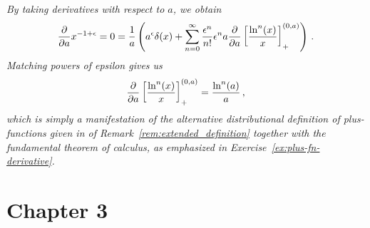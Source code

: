\begin{remarkbox*}{}{}
\textit{
    By taking derivatives with respect to \(a\), we obtain
    \begin{align}
        \frac{\partial}{\partial a}
        x^{-1 + \epsilon}
        =
        0
        =
        \frac{1}{a}
        \left(
            a^\epsilon \delta(x)
            +
            \sum_{n=0}^\infty
            \frac{\epsilon^n}{n!}
            \epsilon^n
            a
            \frac{\partial}{\partial a}
            \left[\frac{\ln^n(x)}{x}\right]_+^{(0,a)}
        \right)
        \,.
    \end{align}
    Matching powers of epsilon gives us
    \begin{align}
        \frac{\partial}{\partial a}
        \left[\frac{\ln^n(x)}{x}\right]_+^{(0,a)}
        =
        \frac{\ln^n(a)}{a}
        \,,
    \end{align}
    which is simply a manifestation of the alternative distributional definition of plus-functions given in  of Remark~\ref{rem:extended_definition} together with the fundamental theorem of calculus, as emphasized in Exercise~\ref{ex:plus-fn-derivative}.
}
\end{remarkbox*}




\section*{Chapter 3}













